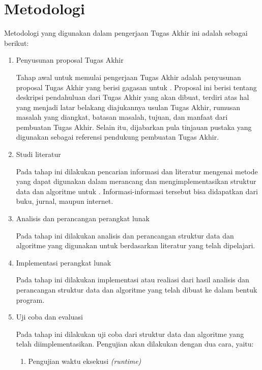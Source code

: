 \section{Metodologi}
\tab Metodologi yang digunakan dalam pengerjaan Tugas Akhir ini adalah sebagai berikut:
\begin{enumerate}
	
	\item Penyusunan proposal Tugas Akhir
	
	\tab Tahap awal untuk memulai pengerjaan Tugas Akhir adalah penyusunan proposal Tugas Akhir yang berisi gagasan untuk \problemm. Proposal ini berisi tentang deskripsi pendahuluan dari Tugas Akhir yang akan dibuat, terdiri atas hal yang menjadi latar belakang diajukannya usulan Tugas Akhir, rumusan masalah yang diangkat, batasan masalah, tujuan, dan manfaat dari pembuatan Tugas Akhir. Selain itu, dijabarkan pula tinjauan pustaka yang digunakan sebagai referensi pendukung pembuatan Tugas Akhir.	
	
	\item Studi literatur
	
	\tab Pada tahap ini dilakukan pencarian informasi dan literatur mengenai metode yang dapat digunakan dalam merancang dan mengimplementasikan struktur data dan algoritme untuk \problemm. Informasi-informasi tersebut bisa didapatkan dari buku, jurnal, maupun internet.
	
	\item Analisis dan perancangan perangkat lunak
	
	\tab Pada tahap ini dilakukan analisis dan perancangan struktur data dan algoritme yang digunakan untuk \problemm berdasarkan literatur yang telah
	dipelajari.
	
	\item Implementasi perangkat lunak
	
	\tab Pada tahap ini dilakukan implementasi atau realiasi dari hasil analisis dan perancangan struktur data dan algoritme yang telah dibuat ke dalam bentuk program.
	
	\item Uji coba dan evaluasi
	
	\tab Pada tahap ini dilakukan uji coba dari struktur data dan algoritme yang telah diimplementasikan. Pengujian akan dilakukan dengan dua cara, yaitu:
	
	\begin{enumerate}
		\item Pengujian waktu eksekusi \textit{(runtime)}
		

\end{enumerate}
\end{enumerate}
